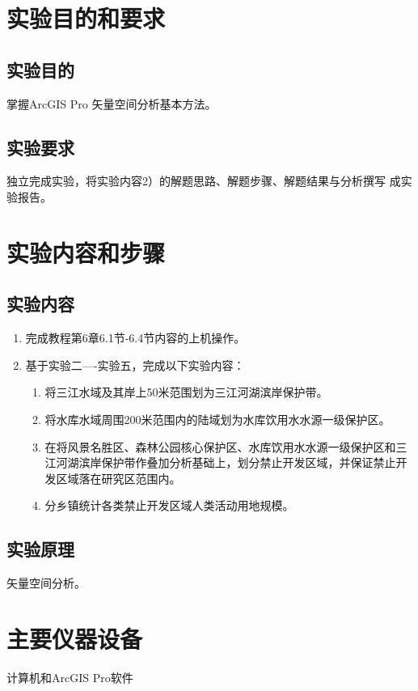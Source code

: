 \documentclass{zjureport}
\begin{document}
\makeheader

\section{实验目的和要求}
\subsection{实验目的}
掌握ArcGIS Pro 矢量空间分析基本方法。

\subsection{实验要求}
独立完成实验，将实验内容2）的解题思路、解题步骤、解题结果与分析撰写
成实验报告。

\section{实验内容和步骤}

\subsection{实验内容}

\begin{enumerate}
    \item 完成教程第6章6.1节-6.4节内容的上机操作。
    \item 基于实验二----实验五，完成以下实验内容：
    \begin{enumerate}
        \item 将三江水域及其岸上50米范围划为三江河湖滨岸保护带。
        \item 将水库水域周围200米范围内的陆域划为水库饮用水水源一级保护区。
        \item 在将风景名胜区、森林公园核心保护区、水库饮用水水源一级保护区和三江河湖滨岸保护带作叠加分析基础上，划分禁止开发区域，并保证禁止开发区域落在研究区范围内。
        \item 分乡镇统计各类禁止开发区域人类活动用地规模。
    \end{enumerate}
\end{enumerate}

\subsection{实验原理}
矢量空间分析。

\section{主要仪器设备}
计算机和ArcGIS Pro软件
\end{document}
